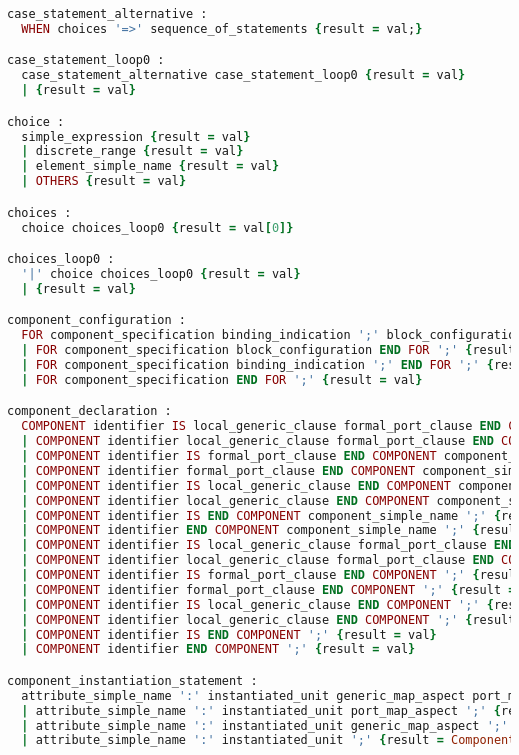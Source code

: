 \begin{lstlisting}[language=Ruby, style=rubystyle]
case_statement_alternative :
  WHEN choices '=>' sequence_of_statements {result = val;}

case_statement_loop0 :
  case_statement_alternative case_statement_loop0 {result = val}
  | {result = val}

choice :
  simple_expression {result = val}
  | discrete_range {result = val}
  | element_simple_name {result = val}
  | OTHERS {result = val}

choices :
  choice choices_loop0 {result = val[0]}

choices_loop0 :
  '|' choice choices_loop0 {result = val}
  | {result = val}

component_configuration :
  FOR component_specification binding_indication ';' block_configuration END FOR ';' {result = val}
  | FOR component_specification block_configuration END FOR ';' {result = val}
  | FOR component_specification binding_indication ';' END FOR ';' {result = val}
  | FOR component_specification END FOR ';' {result = val}

component_declaration :
  COMPONENT identifier IS local_generic_clause formal_port_clause END COMPONENT component_simple_name ';' {result = val}
  | COMPONENT identifier local_generic_clause formal_port_clause END COMPONENT component_simple_name ';' {result = val}
  | COMPONENT identifier IS formal_port_clause END COMPONENT component_simple_name ';' {result = val}
  | COMPONENT identifier formal_port_clause END COMPONENT component_simple_name ';' {result = val}
  | COMPONENT identifier IS local_generic_clause END COMPONENT component_simple_name ';' {result = val}
  | COMPONENT identifier local_generic_clause END COMPONENT component_simple_name ';' {result = val}
  | COMPONENT identifier IS END COMPONENT component_simple_name ';' {result = val}
  | COMPONENT identifier END COMPONENT component_simple_name ';' {result = val}
  | COMPONENT identifier IS local_generic_clause formal_port_clause END COMPONENT ';' {result = val}
  | COMPONENT identifier local_generic_clause formal_port_clause END COMPONENT ';' {result = val}
  | COMPONENT identifier IS formal_port_clause END COMPONENT ';' {result = val}
  | COMPONENT identifier formal_port_clause END COMPONENT ';' {result = val}
  | COMPONENT identifier IS local_generic_clause END COMPONENT ';' {result = val}
  | COMPONENT identifier local_generic_clause END COMPONENT ';' {result = val}
  | COMPONENT identifier IS END COMPONENT ';' {result = val}
  | COMPONENT identifier END COMPONENT ';' {result = val}

component_instantiation_statement :
  attribute_simple_name ':' instantiated_unit generic_map_aspect port_map_aspect ';' {result = ComponentInstantiation.new(val[0], val[2], val[3], val[4]);}
  | attribute_simple_name ':' instantiated_unit port_map_aspect ';' {result = ComponentInstantiation.new(val[0], val[2], nil, val[3]);}
  | attribute_simple_name ':' instantiated_unit generic_map_aspect ';' {result = ComponentInstantiation.new(val[0], val[2], val[3], nil); }
  | attribute_simple_name ':' instantiated_unit ';' {result = ComponentInstantiation.new(val[0], val[2], nil, nil); }


\end{lstlisting}
